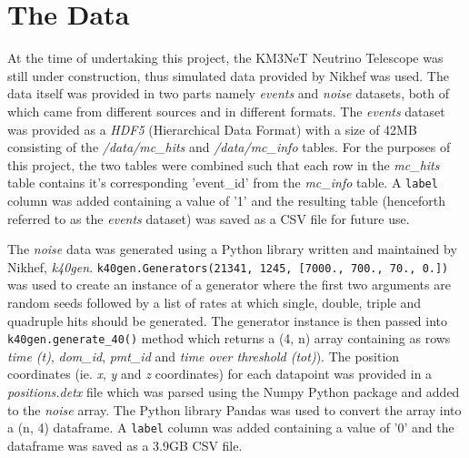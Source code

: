 
\chapter{The Data} %
\label{cha:data}


At the time of undertaking this project, the KM3NeT Neutrino Telescope
was still under construction, thus simulated data provided by Nikhef
was used. The data itself was provided in two parts namely
\emph{events} and \emph{noise} datasets, both of which came from
different sources and in different formats. The \emph{events} dataset
was provided as a \emph{HDF5} (Hierarchical Data Format) with a size
of 42MB consisting of the \emph{/data/mc\_hits} and
\emph{/data/mc\_info} tables. For the purposes of this project, the
two tables were combined such that each row in the \emph{mc\_hits}
table contains it's corresponding 'event\_id' from the
\emph{mc\_info} table. A \texttt{label} column was added containing
a value of '1' and the resulting table (henceforth referred to as the
\emph{events} dataset) was saved as a CSV file for future use.

The \emph{noise} data was generated using a Python library written and
maintained by Nikhef, \emph{k40gen}.
\texttt{k40gen.Generators(21341, 1245, [7000., 700., 70., 0.])} was
used to create an instance of a generator where the first two
arguments are random seeds followed by a list of rates at which
single, double, triple and quadruple hits should be generated. The
generator instance is then passed into \texttt{k40gen.generate\_40()}
method which returns a (4, n) array containing as rows \emph{time
(t)}, \emph{dom\_id}, \emph{pmt\_id} and \emph{time over threshold
(tot)}). The position coordinates (ie. \emph{x}, \emph{y} and \emph{z}
coordinates) for each datapoint was provided in a
\emph{positions.detx} file which was parsed using the Numpy Python
package \cite{numpy} and added to the \emph{noise} array. The Python
library Pandas \cite{pandas} was used to convert the array into a (n,
4) dataframe. A \texttt{label} column was added containing a value of
'0' and the dataframe was saved as a 3.9GB CSV file.

